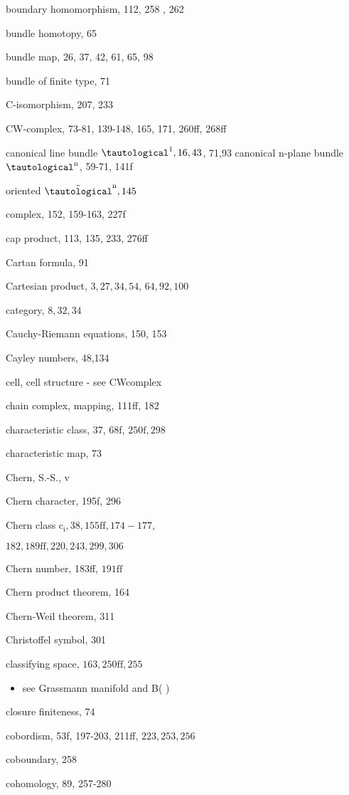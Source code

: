 \documentclass[10pt]{article}
\begin{document}
boundary homomorphism, 112, 258 , 262

bundle homotopy, 65

bundle map, 26, 37, 42, 61, 65, 98

bundle of finite type, 71

C-isomorphism, 207, 233

CW-complex, 73-81, 139-148, 165, 171, 260ff, 268ff

canonical line bundle $\tautological^{1}, 16,43$, 71,93 canonical $\mathrm{n}$-plane bundle $\tautological^{\mathrm{n}}$, 59-71, 141f

oriented $\tilde{\tautological}^{\mathrm{n}}, 145$

complex, 152, 159-163, 227f

cap product, 113, 135, 233, 276ff

Cartan formula, 91

Cartesian product, $3,27,34,54$, $64,92,100$

category, $8,32,34$

Cauchy-Riemann equations, 150, 153

Cayley numbers, 48,134

cell, cell structure - see CWcomplex

chain complex, mapping, 111ff, 182

characteristic class, 37, 68f, $250 \mathrm{f}, 298$

characteristic map, 73

Chern, S.-S., v

Chern character, 195f, 296

Chern class $\mathrm{c}_{\mathfrak{i}}, 38,155 \mathrm{ff}, 174-177$,

$182,189 \mathrm{ff}, 220,243,299,306$

Chern number, 183ff, $191 \mathrm{ff}$

Chern product theorem, 164

Chern-Weil theorem, 311

Christoffel symbol, 301

classifying space, $163,250 \mathrm{ff}, 255$

\begin{itemize}
  \item see Grassmann manifold and B( )
\end{itemize}
closure finiteness, 74

cobordism, 53f, 197-203, 211ff, $223,253,256$

coboundary, 258

cohomology, 89, 257-280
\end{document}
